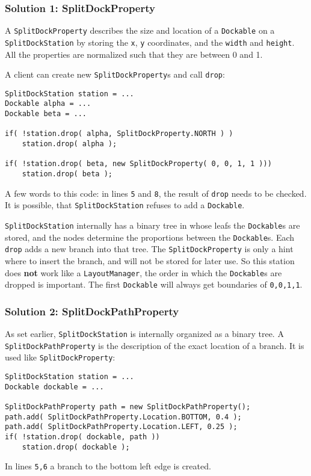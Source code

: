\documentclass[a4paper,10pt]{article}
\newcommand{\src}[1]{\lstinline[basicstyle=\normalsize\ttfamily,keywordstyle=\normalsize\ttfamily,identifierstyle=\normalsize\ttfamily]|#1|}
\begin{document}
\subsubsection{Solution 1: SplitDockProperty}
A \src{SplitDockProperty} describes the size and location of a \src{Dockable} on a \src{SplitDockStation} by storing the \src{x}, \src{y} coordinates, and the \src{width} and \src{height}. All the properties are normalized such that they are between 0 and 1.

A client can create new \src{SplitDockProperty}s and call \src{drop}:
\begin{lstlisting}
SplitDockStation station = ...
Dockable alpha = ...
Dockable beta = ...

if( !station.drop( alpha, SplitDockProperty.NORTH ) )
	station.drop( alpha );

if( !station.drop( beta, new SplitDockProperty( 0, 0, 1, 1 )))
	station.drop( beta );
\end{lstlisting}
A few words to this code: in lines \src{5} and \src{8}, the result of \src{drop} needs to be checked. It is possible, that \src{SplitDockStation} refuses to add a \src{Dockable}.

\src{SplitDockStation} internally has a binary tree in whose leafs the \src{Dockable}s are stored, and the nodes determine the proportions between the \src{Dockable}s. Each \src{drop} adds a new branch into that tree. The \src{SplitDockProperty} is only a hint where to insert the branch, and will not be stored for later use. So this station does \textbf{not} work like a \src{LayoutManager}, the order in which the \src{Dockable}s are dropped is important. The first \src{Dockable} will always get boundaries of \src{0,0,1,1}.

\subsubsection{Solution 2: SplitDockPathProperty}
As set earlier, \src{SplitDockStation} is internally organized as a binary tree. A \src{SplitDockPathProperty} is the description of the exact location of a branch. It is used like \src{SplitDockProperty}:
\begin{lstlisting}
SplitDockStation station = ...
Dockable dockable = ...

SplitDockPathProperty path = new SplitDockPathProperty();
path.add( SplitDockPathProperty.Location.BOTTOM, 0.4 );
path.add( SplitDockPathProperty.Location.LEFT, 0.25 );
if( !station.drop( dockable, path ))
	station.drop( dockable );
\end{lstlisting}
In lines \src{5,6} a branch to the bottom left edge is created.
\end{document}
